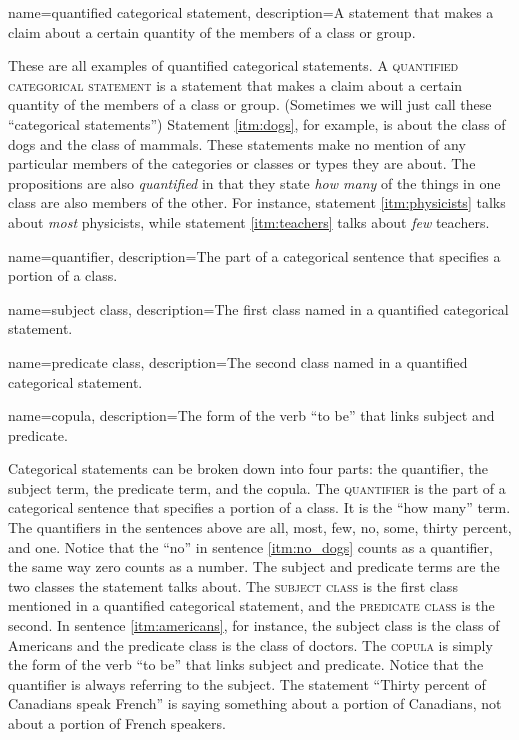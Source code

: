 {
  name=quantified categorical statement,
  description={A statement that makes a claim about a certain quantity of the members of a class or group.}
}

These are all examples of quantified categorical statements. A  \textsc{\gls{quantified categorical statement}} \label{def:quantified_categorical_statement} is a statement that makes a claim about a certain quantity of the members of a class or group. (Sometimes we will just call these ``categorical statements'') Statement \ref{itm:dogs}, for example, is about the class of dogs and the class of mammals. These statements make no mention of any particular members of the categories or classes or types they are about. The propositions are also \textit{quantified} in that they state \textit{how many} of the things in one class are also members of the other. For instance, statement \ref{itm:physicists} talks about \textit{most} physicists, while statement \ref{itm:teachers} talks about \textit{few} teachers.  

{
  name=quantifier,
  description={The part of a categorical sentence that specifies a portion of a class.}
}

{
  name=subject class,
  description={The first class named in a quantified categorical statement.}
}

{
  name=predicate class,
  description={The second class named in a quantified categorical statement.}
  }

{
  name=copula,
  description={The form of the verb ``to be'' that links subject and predicate.}
}

Categorical statements can be broken down into four parts: the quantifier, the subject term, the predicate term, and the copula. The \textsc{\gls{quantifier}} \label{def:quantifier} is the part of a categorical sentence that specifies a portion of a class. It is the ``how many'' term. The quantifiers in the sentences above are all, most, few, no, some, thirty percent, and one. Notice that the ``no'' in sentence \ref{itm:no_dogs} counts as a quantifier, the same way zero counts as a number. The subject and predicate terms are the two classes the statement talks about. The \textsc{\gls{subject class}} \label{def:subject_class} is the first class mentioned in a quantified categorical statement, and the \textsc{\gls{predicate class}} \label{def:predicate_class} is the second. In sentence \ref{itm:americans}, for instance, the subject class is the class of Americans and the predicate class is the class of doctors.  The \textsc{\gls{copula}} \label{def:copula} is simply the form of the verb ``to be'' that links subject and predicate. Notice that the quantifier is always referring to the subject. The statement ``Thirty percent of Canadians speak French'' is saying something about a portion of Canadians, not about a portion of French speakers.

